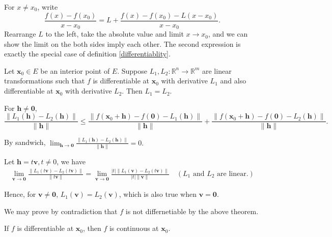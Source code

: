\documentclass[12pt]{article}
\begin{document}
\begin{dbox}
\begin{pf}
For $x\neq x_0$, write
\[\frac{f(x) - f(x_0) }{x - x_0}= L + \frac{f(x) - f(x_0) - L(x - x_0)}{x - x_0}.\]
Rearrange $L$ to the left, take the absolute value and limit $x\to x_0$, and we can show the limit on the both sides imply each other.
The second expression is exactly the special case of definition \eqref{differentiablity}.
\end{pf}
\end{dbox}



\begin{theorem}
Let $\mathbf{x}_0 \in E$ be an interior point of $E$. 
Suppose $L_1, L_2: \mathbb{R}^n \to \mathbb{R}^m$ are linear transformations such that $f$ is differentiable at $\mathbf{x}_0$ with derivative $L_1$ and also differentiable at $\mathbf{x}_0$ with derivative $L_2$. 
Then $L_1 = L_2$.
\end{theorem}


\begin{dbox}
\begin{pf}
For $\mathbf{h}\ne \mathbf{0}$,
\[\frac{\| L_1(\mathbf{h}) - L_2(\mathbf{h}) \|}{\|\mathbf{h}\|}\le
\frac{\| f(\mathbf{x}_0+\mathbf{h})-f(\mathbf{0})-L_1(\mathbf{h}) \|}{\|\mathbf{h}\|} +
\frac{\| f(\mathbf{x}_0+\mathbf{h})-f(\mathbf{0})-L_2(\mathbf{h}) \|}{\|\mathbf{h}\|}.
\]

By sandwich, $\lim_{\mathbf{h}\to\mathbf{0}}\frac{\| L_1(\mathbf{h}) - L_2(\mathbf{h}) \|}{\|\mathbf{h}\|}=0.$

Let $\mathbf{h}=t\mathbf{v}, t\ne 0$, we have
\begin{align*}
\lim_{\mathbf{\mathbf{v}}\to\mathbf{0}}\frac{\| L_1(t\mathbf{v}) - L_2(t\mathbf{v}) \|}{\| t\mathbf{v}\|} = 
\lim_{\mathbf{\mathbf{v}}\to\mathbf{0}}\frac{|t| \|L_1(\mathbf{v}) - L_2(t\mathbf{v})\|}{|t| \|\mathbf{v}\|} \quad (\text{$L_1$ and $L_2$ are linear.})
\end{align*}

Hence, for $\mathbf{v}\ne\mathbf{0}$, $L_1(\mathbf{v})=L_2(\mathbf{v})$, which is also true when $\mathbf{v}=\mathbf{0}.$
\end{pf}
\end{dbox}

We may prove by contradiction that $f$ is not differnetiable by the above theorem.

\begin{theorem}
If $f$ is differentiable at $\mathbf{x}_0$, then $f$ is continuous at $\mathbf{x}_0$.
\end{theorem}
\end{document}
